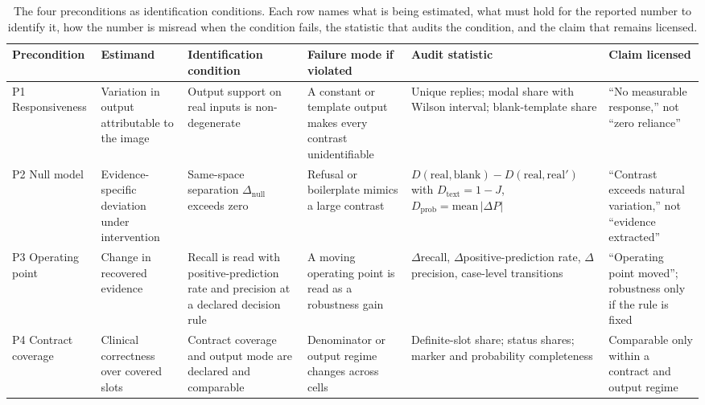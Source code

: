 \begin{table}[H]
\centering
\footnotesize
\setlength{\tabcolsep}{3pt}
\begingroup{}
\caption{The four preconditions as identification conditions. Each row names what is being estimated, what must hold for the reported number to identify it, how the number is misread when the condition fails, the statistic that audits the condition, and the claim that remains licensed.}
\label{tab:framework}
\begin{tabular}{@{}>{\raggedright\arraybackslash}p{}>{\raggedright\arraybackslash}p{}>{\raggedright\arraybackslash}p{}>{\raggedright\arraybackslash}p{}>{\raggedright\arraybackslash}p{}>{\raggedright\arraybackslash}p{}@{}}
\toprule
Precondition & Estimand & Identification condition & Failure mode if violated & Audit statistic & Claim licensed \\
\midrule
P1 Responsiveness & Variation in output attributable to the image & Output support on real inputs is non-degenerate & A constant or template output makes every contrast unidentifiable & Unique replies; modal share with Wilson interval; blank-template share & ``No measurable response,'' not ``zero reliance'' \\
P2 Null model & Evidence-specific deviation under intervention & Same-space separation $\Delta_{\text{null}}$ exceeds zero & Refusal or boilerplate mimics a large contrast & $D(\text{real},\text{blank}) - D(\text{real},\text{real}')$ with $D_{\text{text}}=1-J$, $D_{\text{prob}}=\text{mean}\,|\Delta P|$ & ``Contrast exceeds natural variation,'' not ``evidence extracted'' \\
P3 Operating point & Change in recovered evidence & Recall is read with positive-prediction rate and precision at a declared decision rule & A moving operating point is read as a robustness gain & $\Delta$recall, $\Delta$positive-prediction rate, $\Delta$precision, case-level transitions & ``Operating point moved''; robustness only if the rule is fixed \\
P4 Contract coverage & Clinical correctness over covered slots & Contract coverage and output mode are declared and comparable & Denominator or output regime changes across cells & Definite-slot share; status shares; marker and probability completeness & Comparable only within a contract and output regime \\
\bottomrule
\end{tabular}
\endgroup
\end{table}


